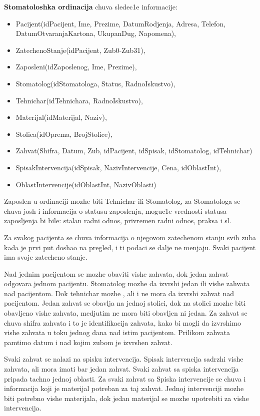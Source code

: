 \documentclass[10 pt]{article}
\begin{document}
\textbf{Stomatoloshka ordinacija} chuva sledec1e informacije:
\begin{itemize} 
	\item Pacijent(idPacijent, Ime, Prezime, DatumRodjenja, Adresa, Telefon, DatumOtvaranjaKartona, UkupanDug, Napomena),
	\item ZatechenoStanje(idPacijent, Zub0-Zub31),
	\item Zaposleni(idZaposlenog, Ime, Prezime),
	\item Stomatolog(idStomatologa, Status, RadnoIskustvo),
	\item Tehnichar(idTehnichara, RadnoIskustvo), 
	\item Materijal(idMaterijal, Naziv),
	\item Stolica(idOprema, BrojStolice), 
	\item Zahvat(Shifra, Datum, Zub, idPacijent, idSpisak, idStomatolog,  idTehnichar) 
	\item SpisakIntervencija(idSpisak, NazivIntervencije, Cena, idOblastInt),
	\item OblastIntervencije(idOblastInt, NazivOblasti)
\end{itemize}

Zaposlen u ordinaciji mozhe biti Tehnichar ili Stomatolog, za Stomatologa se chuva josh i informacija o statusu zaposlenja, moguc1e vrednosti statusa zaposljenja bi bile: stalan radni odnos, privremen radni odnos, praksa i sl. 

Za svakog pacijenta se chuva informacija o njegovom zatechenom stanju svih zuba kada je prvi put doshao na pregled, i ti podaci se dalje ne menjaju. 
Svaki pacijent ima svoje zatecheno stanje.

Nad jednim pacijentom se mozhe obaviti vishe zahvata, dok jedan zahvat odgovara jednom pacijentu. Stomatolog mozhe da izvrshi jedan ili vishe zahvata nad pacijentom. Dok tehnichar mozhe , ali i ne mora da izvrshi zahvat nad pacijentom. Jedan zahvat se obavlja na jednoj stolici, dok na stolici mozhe biti obavljeno vishe zahvata, medjutim ne mora biti obavljen ni jedan. Za zahvat se chuva shifra zahvata i to je identifikacija zahvata, kako bi mogli da izvrshimo vishe zahvata u toku jednog dana nad istim pacijentom.  Prilikom zahvata pamtimo datum i nad kojim zubom je izvrshen zahvat.

Svaki zahvat se nalazi na spisku intervencija. Spisak intervencija sadrzhi vishe zahvata, ali mora imati bar jedan zahvat. Svaki zahvat sa spiska intervencija pripada tachno jednoj oblasti. Za svaki zahvat sa Spiska intervencije se chuva i informacija koji je materijal potreban za taj zahvat. Jednoj intervenciji mozhe biti potrebno vishe materijala, dok jedan materijal se mozhe upotrebiti za vishe intervencija.
\end{document}
